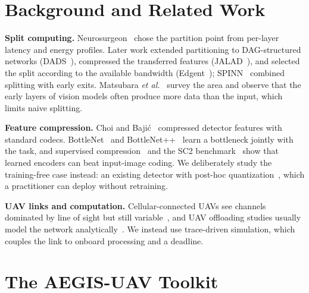 \documentclass[journal,twocolumn,10pt]{IEEEtran}
\begin{document}
\section{Background and Related Work}
\textbf{Split computing.} Neurosurgeon~\cite{kang2017neurosurgeon} chose the partition point from per-layer latency and energy profiles. Later work extended partitioning to DAG-structured networks (DADS~\cite{hu2019dads}), compressed the transferred features (JALAD~\cite{li2018jalad}), and selected the split according to the available bandwidth (Edgent~\cite{li2020edgent}); SPINN~\cite{laskaridis2020spinn} combined splitting with early exits. Matsubara \emph{et al.}~\cite{matsubara2022survey} survey the area and observe that the early layers of vision models often produce more data than the input, which limits naive splitting.

\textbf{Feature compression.} Choi and Baji\'{c}~\cite{choi2018deep} compressed detector features with standard codecs. BottleNet~\cite{eshratifar2019bottlenet} and BottleNet++~\cite{shao2020bottlenetpp} learn a bottleneck jointly with the task, and supervised compression~\cite{matsubara2022supervised} and the SC2 benchmark~\cite{matsubara2023sc2} show that learned encoders can beat input-image coding. We deliberately study the training-free case instead: an existing detector with post-hoc quantization~\cite{jacob2018quantization,krishnamoorthi2018quantizing}, which a practitioner can deploy without retraining.

\textbf{UAV links and computation.} Cellular-connected UAVs see channels dominated by line of sight but still variable~\cite{zeng2019cellular,3gpp36777}, and UAV offloading studies usually model the network analytically~\cite{mozaffari2019tutorial}. We instead use trace-driven simulation, which couples the link to onboard processing and a deadline.

\section{The AEGIS-UAV Toolkit}\label{sec:toolkit}
\end{document}
